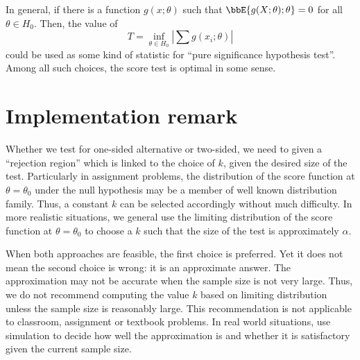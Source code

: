 In general, if there is a function $g(x; \theta)$ 
such that $\bbE\{ g(X; \theta); \theta\} = 0$
for all $\theta \in H_0$. Then, the value of
\[
T
= \inf_{\theta \in H_0} |\sum g(x_i; \theta) |
\]
could be used as some kind of statistic for
``pure significance hypothesis test''.
Among all such choices, the score test is optimal
in some sense.

\section{Implementation remark}
Whether we test for one-sided alternative or two-sided, we need to
given a ``rejection region'' which is linked to the choice of $k$, given
the desired size of the test. Particularly in assignment problems, the
distribution of the score function at $\theta = \theta_0$ under the
null hypothesis may be a member of well known distribution family.
Thus, a constant $k$ can be selected accordingly without much difficulty.
In more realistic situations, we general use the limiting distribution of
the score function at $\theta = \theta_0$ to choose a $k$ such that
the size of the test is approximately $\alpha$.

When both approaches are feasible, the first choice is preferred.
Yet it does not mean the second choice is wrong: it is an approximate
answer. The approximation may not be accurate when the sample
size is not very large. Thus, we do not recommend computing the
value $k$ based on limiting distribution unless the sample size
is reasonably large. This recommendation is not applicable to
classroom, assignment or textbook problems. In real world situations, use
simulation to decide how well the approximation is and whether it
is satisfactory given the current sample size.

